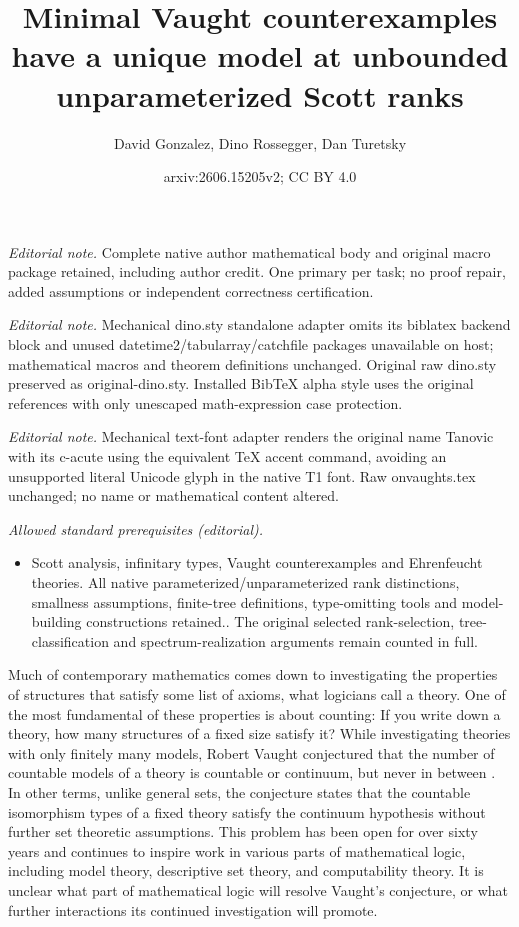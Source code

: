 \documentclass[10pt,a4paper]{amsart}
\title{Minimal Vaught counterexamples have a unique model at unbounded unparameterized Scott ranks}
\author{David Gonzalez, Dino Rossegger, Dan Turetsky}
\date{arxiv:2606.15205v2; CC BY 4.0}
\renewcommand{\-}{\text{-}}
\begin{document}
\maketitle
\noindent\textit{Editorial note.} Complete native author mathematical body and original macro package retained, including author credit. One primary per task; no proof repair, added assumptions or independent correctness certification.\par\medskip
\noindent\textit{Editorial note.} Mechanical dino.sty standalone adapter omits its biblatex backend block and unused datetime2/tabularray/catchfile packages unavailable on host; mathematical macros and theorem definitions unchanged. Original raw dino.sty preserved as original-dino.sty. Installed BibTeX alpha style uses the original references with only unescaped math-expression case protection.\par\medskip
\noindent\textit{Editorial note.} Mechanical text-font adapter renders the original name Tanovic with its c-acute using the equivalent TeX accent command, avoiding an unsupported literal Unicode glyph in the native T1 font. Raw onvaughts.tex unchanged; no name or mathematical content altered.\par\medskip
\noindent\textit{Allowed standard prerequisites (editorial).}\begin{itemize}
\item Scott analysis, infinitary types, Vaught counterexamples and Ehrenfeucht theories. All native parameterized/unparameterized rank distinctions, smallness assumptions, finite-tree definitions, type-omitting tools and model-building constructions retained.. The original selected rank-selection, tree-classification and spectrum-realization arguments remain counted in full.
\end{itemize}\medskip
Much of contemporary mathematics comes down to investigating the properties of structures that satisfy some list of axioms, what logicians call a theory.
One of the most fundamental of these properties is about counting:
If you write down a theory, how many structures of a fixed size satisfy it?
While investigating theories with only finitely many models, Robert Vaught conjectured that the number of countable models of a theory is countable or continuum, but never in between \cite{Vau61}.
In other terms, unlike general sets, the conjecture states that the countable isomorphism types of a fixed theory satisfy the continuum hypothesis without further set theoretic assumptions.
This problem has been open for over sixty years and continues to inspire work in various parts of mathematical logic, including model theory, descriptive set theory, and computability theory.
It is unclear what part of mathematical logic will resolve Vaught's conjecture, or what further interactions its continued investigation will promote.
\end{document}
